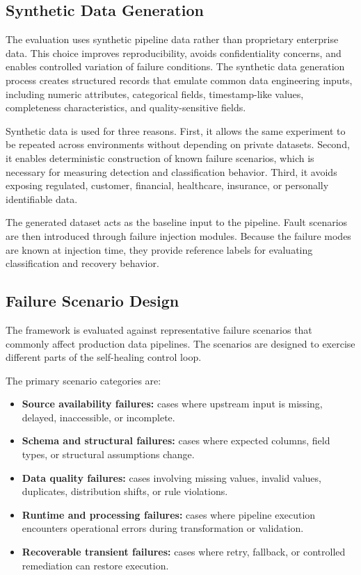 \subsection{Synthetic Data Generation}

The evaluation uses synthetic pipeline data rather than proprietary enterprise data. This choice improves reproducibility, avoids confidentiality concerns, and enables controlled variation of failure conditions. The synthetic data generation process creates structured records that emulate common data engineering inputs, including numeric attributes, categorical fields, timestamp-like values, completeness characteristics, and quality-sensitive fields.

Synthetic data is used for three reasons. First, it allows the same experiment to be repeated across environments without depending on private datasets. Second, it enables deterministic construction of known failure scenarios, which is necessary for measuring detection and classification behavior. Third, it avoids exposing regulated, customer, financial, healthcare, insurance, or personally identifiable data.

The generated dataset acts as the baseline input to the pipeline. Fault scenarios are then introduced through failure injection modules. Because the failure modes are known at injection time, they provide reference labels for evaluating classification and recovery behavior.

\subsection{Failure Scenario Design}

The framework is evaluated against representative failure scenarios that commonly affect production data pipelines. The scenarios are designed to exercise different parts of the self-healing control loop.

The primary scenario categories are:

\begin{itemize}
    \item \textbf{Source availability failures:} cases where upstream input is missing, delayed, inaccessible, or incomplete.
    \item \textbf{Schema and structural failures:} cases where expected columns, field types, or structural assumptions change.
    \item \textbf{Data quality failures:} cases involving missing values, invalid values, duplicates, distribution shifts, or rule violations.
    \item \textbf{Runtime and processing failures:} cases where pipeline execution encounters operational errors during transformation or validation.
    \item \textbf{Recoverable transient failures:} cases where retry, fallback, or controlled remediation can restore execution.
\end{itemize}


